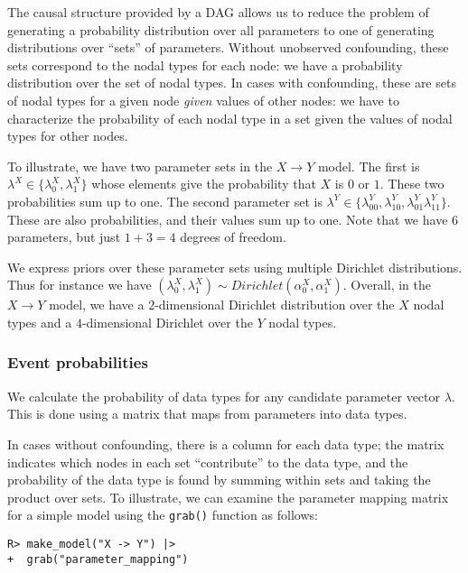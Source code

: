 \documentclass[
  11pt,
  article]{jss}
\begin{document}
The causal structure provided by a DAG allows us to reduce the problem
of generating a probability distribution over all parameters to one of
generating distributions over ``sets'' of parameters. Without unobserved
confounding, these sets correspond to the nodal types for each node: we
have a probability distribution over the set of nodal types. In cases
with confounding, these are sets of nodal types for a given node
\emph{given} values of other nodes: we have to characterize the
probability of each nodal type in a set given the values of nodal types
for other nodes.

To illustrate, we have two parameter sets in the \(X \rightarrow Y\)
model. The first is \(\lambda^X \in \{\lambda^X_0, \lambda^X_1\}\) whose
elements give the probability that \(X\) is \(0\) or \(1\). These two
probabilities sum up to one. The second parameter set is
\(\lambda^Y \in \{\lambda^Y_{00}, \lambda^Y_{10}, \lambda^Y_{01} \lambda^Y_{11}\}\).
These are also probabilities, and their values sum up to one. Note that
we have \(6\) parameters, but just \(1 + 3 = 4\) degrees of freedom.

We express priors over these parameter sets using multiple Dirichlet
distributions. Thus for instance we have
\((\lambda^X_0, \lambda^X_1) \sim Dirichlet(\alpha^X_0, \alpha^X_1).\)
Overall, in the \(X \rightarrow Y\) model, we have a \(2\)-dimensional
Dirichlet distribution over the \(X\) nodal types and a
\(4\)-dimensional Dirichlet over the \(Y\) nodal types.

\subsubsection{Event probabilities}\label{event-probabilities}

We calculate the probability of data types for any candidate parameter
vector \(\lambda\). This is done using a matrix that maps from
parameters into data types.

In cases without confounding, there is a column for each data type; the
matrix indicates which nodes in each set ``contribute'' to the data
type, and the probability of the data type is found by summing within
sets and taking the product over sets. To illustrate, we can examine the
parameter mapping matrix for a simple model using the \texttt{grab()}
function as follows:

\begin{verbatim}
R> make_model("X -> Y") |> 
+  grab("parameter_mapping") 
\end{verbatim}
\end{document}

